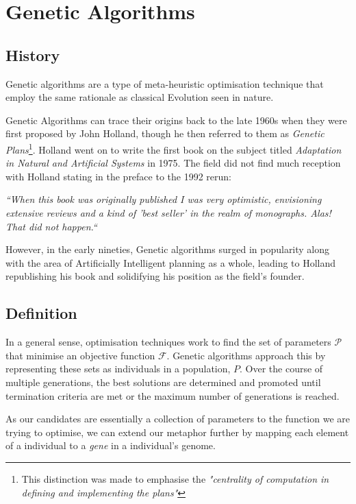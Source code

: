 \section{Genetic Algorithms}

\subsection{History}

Genetic algorithms are a type of meta-heuristic optimisation technique that employ the same rationale as classical Evolution seen in nature.

Genetic Algorithms can trace their origins back to the late 1960s when they were first proposed by John Holland, though he then referred to them as \textit{Genetic Plans}\footnote{This distinction was made to emphasise the \textit{"centrality of computation in defining and implementing the plans"}\cite{hollandAdaptationNaturalArtificial1992a}}. Holland went on to write the first book on the subject titled \textit{Adaptation in Natural and Artificial Systems}\cite{hollandAdaptationNaturalArtificial1992} in 1975. The field did not find much reception with Holland stating in the preface to the 1992 rerun:

\begin{displayquote}
\textit{``When this book was originally published I was very optimistic, envisioning extensive reviews and a kind of 'best seller' in the realm of monographs. Alas! That did not happen.``}
\end{displayquote}

However, in the early nineties, Genetic algorithms surged in popularity along with the area of Artificially Intelligent planning as a whole, leading to Holland republishing his book and solidifying his position as the field's founder.

\subsection{Definition}
In a general sense, optimisation techniques work to find the set of parameters $\mathcal{P}$ that minimise an objective function $\mathcal{F}$. 
Genetic algorithms approach this by representing these sets as individuals in a population, $P$. Over the course of multiple generations, the best solutions are determined and promoted until termination criteria are met or the maximum number of generations is reached.

As our candidates are essentially a collection of parameters to the function we are trying to optimise, we can extend our metaphor further by mapping each element of a individual to a \textit{gene} in a individual's genome. 

